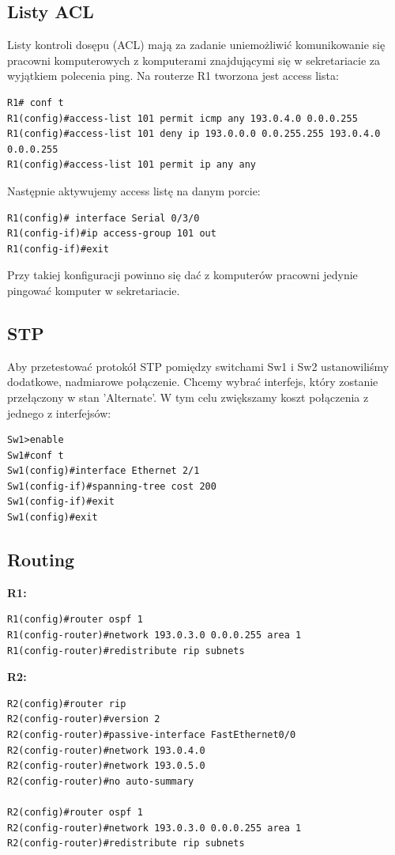 \documentclass[11pt,a4paper]{article}
\begin{document}
\subsection{Listy ACL}
Listy kontroli dosępu (ACL) mają za zadanie uniemożliwić komunikowanie się pracowni komputerowych z komputerami znajdującymi się w sekretariacie za wyjątkiem polecenia ping. Na routerze R1 tworzona jest access lista:
\begin{lstlisting}
R1# conf t
R1(config)#access-list 101 permit icmp any 193.0.4.0 0.0.0.255 
R1(config)#access-list 101 deny ip 193.0.0.0 0.0.255.255 193.0.4.0 0.0.0.255
R1(config)#access-list 101 permit ip any any
\end{lstlisting}
Następnie aktywujemy access listę na danym porcie:
\begin{lstlisting}
R1(config)# interface Serial 0/3/0
R1(config-if)#ip access-group 101 out	
R1(config-if)#exit 
\end{lstlisting}
Przy takiej konfiguracji powinno się dać z komputerów pracowni jedynie pingować komputer w sekretariacie.

\subsection{STP}
Aby przetestować protokół STP pomiędzy switchami Sw1 i Sw2 ustanowiliśmy dodatkowe, nadmiarowe połączenie. Chcemy wybrać interfejs, który zostanie przełączony w stan 'Alternate'. W tym celu zwiększamy koszt połączenia z jednego z interfejsów:
\begin{lstlisting}
Sw1>enable
Sw1#conf t
Sw1(config)#interface Ethernet 2/1
Sw1(config-if)#spanning-tree cost 200
Sw1(config-if)#exit
Sw1(config)#exit
\end{lstlisting}

\subsection{Routing}
{\bf R1:}\\
\begin{lstlisting}
R1(config)#router ospf 1
R1(config-router)#network 193.0.3.0 0.0.0.255 area 1
R1(config-router)#redistribute rip subnets 
 \end{lstlisting}
{\bf R2:}\\
\begin{lstlisting}
R2(config)#router rip
R2(config-router)#version 2
R2(config-router)#passive-interface FastEthernet0/0
R2(config-router)#network 193.0.4.0
R2(config-router)#network 193.0.5.0
R2(config-router)#no auto-summary

R2(config)#router ospf 1
R2(config-router)#network 193.0.3.0 0.0.0.255 area 1
R2(config-router)#redistribute rip subnets 
 \end{lstlisting}
\end{document}

